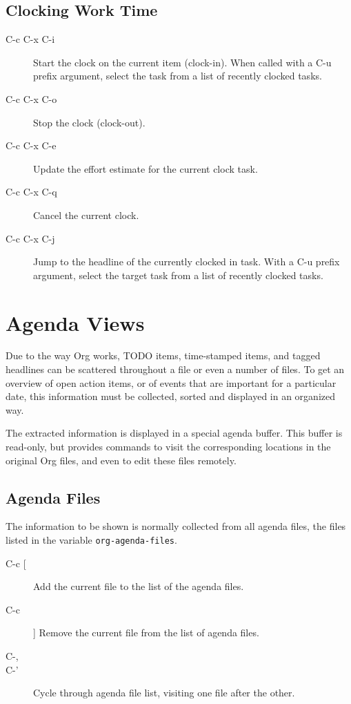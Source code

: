 \subsection{Clocking Work Time}
\begin{description}
\item[C-c C-x C-i] Start the clock on the current item (clock-in). When called with a C-u prefix argument, select the task from a list of recently clocked tasks.
\item[C-c C-x C-o] Stop the clock (clock-out). 
\item[C-c C-x C-e] Update the effort estimate for the current clock task. 
\item[C-c C-x C-q] Cancel the current clock. 
\item[C-c C-x C-j] Jump to the headline of the currently clocked in task. With a C-u prefix argument, select the target task from a list of recently clocked tasks. 
\end{description}



\section{Agenda Views}
Due to the way Org works, TODO items, time-stamped items, and tagged headlines can be scattered throughout a file or even a number of files. To get an overview of open action items, or of events that are important for a particular date, this information must be collected, sorted and displayed in an organized way.

The extracted information is displayed in a special agenda buffer. This buffer is read-only, but provides commands to visit the corresponding locations in the original Org files, and even to edit these files remotely.


\subsection{Agenda Files}
The information to be shown is normally collected from all agenda files, the files listed in the variable \verb|org-agenda-files|.

\begin{description}
\item [C-c [] Add the current file to the list of the agenda files.
\item [C-c ]] Remove the current file from the list of agenda files.
\item [C-,] 
\item [C-'] Cycle through agenda file list, visiting one file after the other. 
\end{description}

